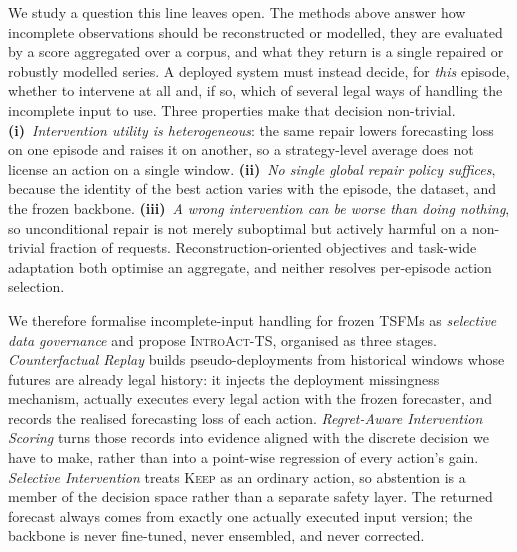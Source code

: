 \documentclass{article}
\newcommand{\introact}{\textsc{IntroAct-TS}}
\newcommand{\tsfm}{TSFM}
\begin{document}
We study a question this line leaves open. The methods above answer how incomplete
observations should be reconstructed or modelled, they are evaluated by a score aggregated
over a corpus, and what they return is a single repaired or robustly modelled series. A
deployed system must instead decide, for \emph{this} episode, whether to intervene at all
and, if so, which of several legal ways of handling the incomplete input to use. Three
properties make that decision non-trivial. \textbf{(i)}~\emph{Intervention utility is
heterogeneous}: the same repair lowers forecasting loss on one episode and raises it on
another, so a strategy-level average does not license an action on a single window.
\textbf{(ii)}~\emph{No single global repair policy suffices}, because the identity of the
best action varies with the episode, the dataset, and the frozen backbone.
\textbf{(iii)}~\emph{A wrong intervention can be worse than doing nothing}, so unconditional
repair is not merely suboptimal but actively harmful on a non-trivial fraction of requests.
Reconstruction-oriented objectives and task-wide adaptation both optimise an aggregate, and
neither resolves per-episode action selection.

We therefore formalise incomplete-input handling for frozen \tsfm{}s as \emph{selective data
governance} and propose \introact{}, organised as three stages. \emph{Counterfactual Replay}
builds pseudo-deployments from historical windows whose futures are already legal history: it
injects the deployment missingness mechanism, actually executes every legal action with the
frozen forecaster, and records the realised forecasting loss of each action.
\emph{Regret-Aware Intervention Scoring} turns those records into evidence aligned with the
discrete decision we have to make, rather than into a point-wise regression of every action's
gain. \emph{Selective Intervention} treats \textsc{Keep} as an ordinary action, so abstention
is a member of the decision space rather than a separate safety layer. The returned forecast
always comes from exactly one actually executed input version; the backbone is never
fine-tuned, never ensembled, and never corrected.
\end{document}
